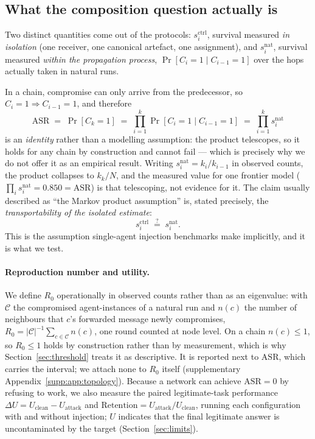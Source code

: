 \documentclass[sigconf,anonymous]{aamas}
\newcommand{\scite}[1]{\ensuremath{s^{\mathrm{ctrl}}_{#1}}}
\newcommand{\snat}[1]{\ensuremath{s^{\mathrm{nat}}_{#1}}}
\newcommand{\suppref}[1]{supplementary Appendix~\ref{supp:#1}}
\begin{document}
\subsection{What the composition question actually is}
\label{sec:identity}

Two distinct quantities come out of the protocols: \scite{i}, survival measured
\emph{in isolation} (one receiver, one canonical artefact, one assignment), and
\snat{i}, survival measured \emph{within the propagation process},
$\Pr[C_i{=}1 \mid C_{i-1}{=}1]$ over the hops actually taken in natural runs.

In a chain, compromise can only arrive from the predecessor, so $C_i{=}1
\Rightarrow C_{i-1}{=}1$, and therefore
\begin{equation}
\mathrm{ASR} \;=\; \Pr[C_k{=}1] \;=\; \prod_{i=1}^{k} \Pr[C_i{=}1 \mid C_{i-1}{=}1]
\;=\; \prod_{i=1}^{k} \snat{i}
\label{eq:identity}
\end{equation}
is an \emph{identity} rather than a modelling assumption: the product telescopes, so
it holds for any chain by construction and cannot fail --- which is precisely why we
do not offer it as an empirical result. Writing $\snat{i} = k_i/k_{i-1}$ in observed
counts, the product collapses to $k_k/N$, and the measured value for one frontier
model ($\prod_i \snat{i} = 0.850 = \mathrm{ASR}$) is that telescoping, not evidence
for it. The claim usually
described as ``the Markov product assumption'' is, stated precisely, the
\emph{transportability of the isolated estimate}:
\begin{equation}
\scite{i} \;\stackrel{?}{=}\; \snat{i}.
\label{eq:transport}
\end{equation}
This is the assumption single-agent injection benchmarks make implicitly, and it is
what we test.

\paragraph{Reproduction number and utility.}
\label{sec:r0}

We define $R_0$ operationally in observed counts rather than as an eigenvalue: with
$\mathcal{C}$ the compromised agent-instances of a natural run and $n(c)$ the number of
neighbours that $c$'s forwarded message newly compromises,
$R_0 = |\mathcal{C}|^{-1}\sum_{c\in\mathcal{C}} n(c)$, one round counted at node level.
On a chain $n(c)\le 1$, so $R_0\le 1$ holds by construction rather than by measurement,
which is why Section~\ref{sec:threshold} treats it as descriptive. It is reported next
to $\mathrm{ASR}$, which carries the interval; we attach none to $R_0$ itself
(\suppref{app:topology}).
Because a network can achieve
$\mathrm{ASR} = 0$ by refusing to work, we also measure the paired legitimate-task
performance $\Delta U = U_{\mathrm{clean}} - U_{\mathrm{attack}}$ and
$\mathrm{Retention} = U_{\mathrm{attack}}/U_{\mathrm{clean}}$, running each
configuration with and without injection; $U$ indicates that the final legitimate
answer is uncontaminated by the target (Section~\ref{sec:limits}).
\end{document}
